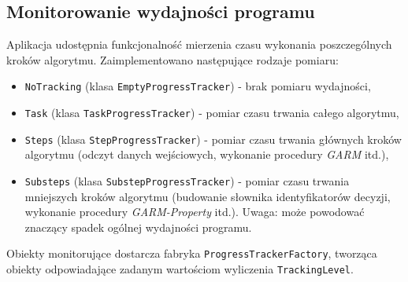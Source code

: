 \documentclass[a4paper,10pt]{article}
\begin{document}
 
 \subsection{Monitorowanie wydajności programu} \label{sec:impl:track}
 Aplikacja udostępnia funkcjonalność mierzenia czasu wykonania poszczególnych kroków algorytmu.
 Zaimplementowano następujące rodzaje pomiaru:
 
 \begin{itemize}
  \item \verb+NoTracking+ (klasa \verb+EmptyProgressTracker+) - brak pomiaru wydajności,
  \item \verb+Task+ (klasa \verb+TaskProgressTracker+) - pomiar czasu trwania całego algorytmu,
  \item \verb+Steps+ (klasa \verb+StepProgressTracker+) - pomiar czasu trwania głównych kroków algorytmu (odczyt danych wejściowych, wykonanie procedury \emph{GARM} itd.),
  \item \verb+Substeps+ (klasa \verb+SubstepProgressTracker+) - pomiar czasu trwania mniejszych kroków algorytmu (budowanie słownika identyfikatorów decyzji, wykonanie procedury \emph{GARM-Property} itd.). Uwaga: może powodować znaczący spadek ogólnej wydajności programu.
 \end{itemize}

 Obiekty monitorujące dostarcza fabryka \verb+ProgressTrackerFactory+, tworząca obiekty odpowiadające zadanym wartościom wyliczenia \verb+TrackingLevel+.
\end{document}
